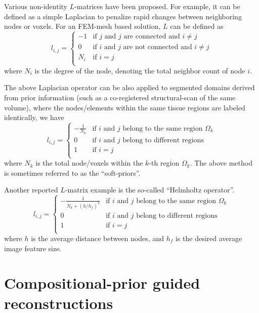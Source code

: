 \documentclass{article}
\begin{document}
Various non-identity $L$-matrices have been proposed. For example, it can be defined as a simple Laplacian to penalize rapid changes between neighboring nodes or voxels. For an FEM-mesh based solution, $L$ can be defined as 
\begin{equation}
l_{i,j}=\left\{\begin{array}{cl}
-1 & \textrm{if $j$ and $j$ are connected and $i\ne j$}\\
0 &\textrm{if $i$ and $j$ are not connected and $i\ne j$}\\
N_i & \textrm{if $i=j$}\\
\end{array}\right.
\end{equation}
where $N_i$ is the degree of the node, denoting the total neighbor count of node $i$.

The above Laplacian operator can be also applied to segmented domains derived from prior information (such as a co-registered structural-scan of the same volume), where the nodes/elements within the same tissue regions are labeled identically, we have
\begin{equation}
l_{i,j}=\left\{\begin{array}{cl}
-\frac{1}{N_k} & \textrm{if $i$ and $j$ belong to the same region $\Omega_k$}\\
0 &\textrm{if $i$ and $j$ belong to different regions}\\
1 & \textrm{if $i=j$}\\
\end{array}\right.
\end{equation}
where $N_k$ is the total node/voxels within the $k$-th region $\Omega_k$. The above method is sometimes referred to as the ``soft-priors''.

Another reported $L$-matrix example is the so-called ``Helmholtz operator''. 
\begin{equation}
l_{i,j}=\left\{\begin{array}{cl}
-\frac{1}{N_k +(h/h_f)^2}& \textrm{if $i$ and $j$ belong to the same region $\Omega_k$}\\
0 &\textrm{if $i$ and $j$ belong to different regions}\\
1 & \textrm{if $i=j$}\\
\end{array}\right.
\end{equation}
where $h$ is the average distance between nodes, and $h_f$ is the desired average image feature size.

\section{Compositional-prior guided reconstructions}
\end{document}
